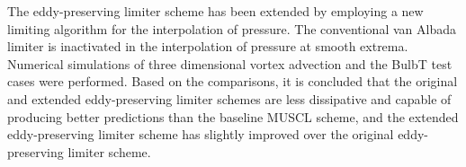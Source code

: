 The eddy-preserving limiter scheme has been extended by employing a new limiting algorithm for the interpolation of pressure. The conventional van Albada limiter is inactivated in the interpolation of pressure at smooth extrema. Numerical simulations of three dimensional vortex advection and the BulbT test cases were performed. Based on the comparisons, it is concluded that the original and extended eddy-preserving limiter schemes are less dissipative and capable of producing better predictions than the baseline MUSCL scheme, and the extended eddy-preserving limiter scheme has slightly improved over the original eddy-preserving limiter scheme.